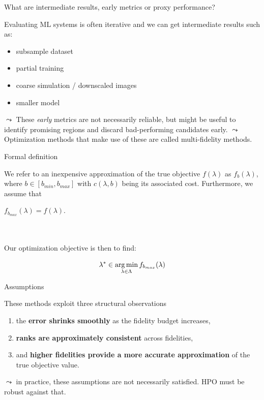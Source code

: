 \documentclass[main]{subfiles}
\begin{document}
\begin{frame}[c]{What are intermediate results, early metrics or proxy performance?}

Evaluating ML systems is often iterative and we can get intermediate results such as:
\begin{itemize}
    \item subsample dataset
    \item partial training
    \item coarse simulation / downscaled images
    \item smaller model
\end{itemize}

$\leadsto$ These \textit{early} metrics are not necessarily reliable, but might be useful to identify promising regions and discard bad-performing candidates early.
$\leadsto$ Optimization methods that make use of these are called multi-fidelity methods.

\end{frame}
\begin{frame}[c]{Formal definition}

We refer to an inexpensive approximation of the true objective $f(\lambda)$ as $f_b(\lambda)$, where $b \in [b_{min}, b_{max}]$ with $c(\lambda,b)$ being its associated cost. Furthermore, we assume that \item $f_{b_{max}}(\lambda) = f(\lambda)$.

\\~\\
Our optimization objective is then to find:

\begin{equation}
\lambda^* \in \operatorname*{arg\,min}_{\lambda \in \Lambda} f_{b_{max}}(\lambda)
\end{equation}

\end{frame}
\begin{frame}[c]{Assumptions}

These methods exploit three structural observations
\begin{enumerate}
    \item the \textbf{error shrinks smoothly} as the fidelity budget increases,
    \item \textbf{ranks are approximately consistent} across fidelities,
    \item and \textbf{higher fidelities provide a more accurate approximation} of the true objective value.
\end{enumerate}

$\leadsto$ in practice, these assumptions are not necessarily satisfied. HPO must be robust against that.

\end{frame}
\end{document}
